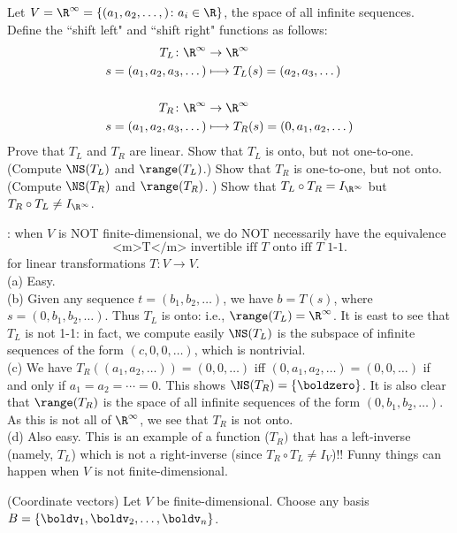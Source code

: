 \begin{samepage}
\ii Let $V=\R^\infty=\{(a_1,a_2,\dots, )\colon a_i\in\R\}$, the space of all infinite sequences. Define the ``shift left" and ``shift right" functions as follows:
\begin{align*}
T_L\colon \R^\infty&\rightarrow \R^\infty\\
s=(a_1,a_2, a_3,\dots )&\longmapsto T_L(s)=(a_2, a_3,\dots) \\
\\
T_R\colon \R^\infty&\rightarrow \R^\infty\\
s=(a_1,a_2, a_3,\dots )&\longmapsto T_R(s)=(0,a_1,a_2,\dots) 
\end{align*}
\bb
\ii Prove that $T_L$ and $T_R$ are linear. 
\ii Show that $T_L$ is onto, but not one-to-one. (Compute $\NS(T_L)$ and $\range(T_L)$.)
\ii Show that $T_R$ is one-to-one, but not onto. (Compute $\NS(T_R)$ and $\range(T_R)$. )
\ii Show that $T_L\circ T_R=I_{\R^\infty}$ but $T_R\circ T_L\ne I_{\R^\infty}$. 
\ee
\end{samepage}
\begin{solution}
: when $V$ is NOT finite-dimensional, we do NOT necessarily have the equivalence
\[
\text{<m>T</m> invertible iff $T$ onto iff $T$ 1-1}.
\]
for linear transformations $T\colon V\rightarrow V$.  
\\
(a) Easy. 
\\
(b) Given any sequence $t=(b_1,b_2,\dots )$, we have $b=T(s)$, where $s=(0,b_1,b_2,\dots)$. Thus $T_L$ is onto: i.e., $\range(T_L)=\R^\infty$. It is east to see that $T_L$ is not 1-1: in fact, we compute easily $\NS(T_L)$ is the subspace of infinite sequences of the form $(c,0,0,\dots)$, which is nontrivial. 
\\
(c) We have $T_R((a_1,a_2,\dots))=(0,0,\dots)$ iff $(0,a_1,a_2,\dots)=(0,0,\dots)$ if and only if $a_1=a_2=\cdots =0$. This shows $\NS(T_R)=\{\boldzero\}$. It is also clear that $\range(T_R)$ is the space of all infinite sequences of the form $(0,b_1,b_2,\dots)$. As this is not all of $\R^\infty$, we see that $T_R$ is not onto. 
\\
(d) Also easy. This is an example of a function ($T_R)$ that has a left-inverse (namely, $T_L$) which is not a right-inverse (since $T_R\circ T_L\ne I_V$)!! Funny things can happen when $V$ is not finite-dimensional. 
\end{solution}
\ii (Coordinate vectors) Let $V$ be finite-dimensional. Choose any basis $B=\{\boldv_1,\boldv_2,\dots , \boldv_n\}$.
\\
